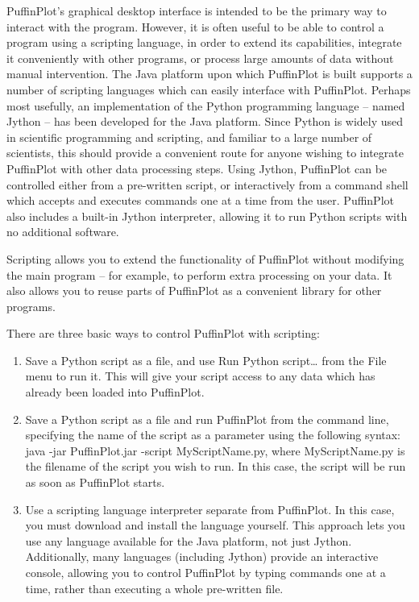 \documentclass[a4paper,british]{article}
\newcommand{\ppcmd}[1]{\textsf{#1}} %
\begin{document}
PuffinPlot's graphical desktop interface is intended to be the primary way to
interact with the program. However, it is often useful to be able to control
a program using a scripting language, in order to extend its capabilities,
integrate it conveniently with other programs, or process large amounts of
data without manual intervention. The Java platform upon which PuffinPlot is
built supports a number of scripting languages which can easily interface
with PuffinPlot. Perhaps most usefully, an implementation of the Python
programming language -- named Jython \citep{juneau2009jython} -- has been
developed for the Java platform. Since Python is widely used in scientific
programming and scripting, and familiar to a large number of scientists, this
should provide a convenient route for anyone wishing to integrate PuffinPlot
with other data processing steps. Using Jython, PuffinPlot can be controlled
either from a pre-written script, or interactively from a command shell which
accepts and executes commands one at a time from the user. PuffinPlot also
includes a built-in Jython interpreter, allowing it to run Python scripts
with no additional software.

Scripting allows you to extend the functionality of PuffinPlot without
modifying the main program -- for example, to perform extra processing on
your data. It also allows you to reuse parts of PuffinPlot as a convenient
library for other programs.

There are three basic ways to control PuffinPlot with scripting:

\begin{enumerate}

\item Save a Python script as a file, and use \ppcmd{Run Python script\ldots}
  from the \ppcmd{File} menu to run it. This will give your script access to
  any data which has already been loaded into PuffinPlot.

\item Save a Python script as a file and run PuffinPlot from the command
  line, specifying the name of the script as a parameter using the following
  syntax: \ppcmd{java -jar PuffinPlot.jar -script MyScriptName.py}, where
  \ppcmd{MyScriptName.py} is the filename of the script you wish to run.
  In this case, the script will be run as soon as PuffinPlot starts.

\item Use a scripting language interpreter separate from PuffinPlot. In this
  case, you must download and install the language yourself. This approach
  lets you use any language available for the Java platform, not just Jython.
  Additionally, many languages (including Jython) provide an interactive
  console, allowing you to control PuffinPlot by typing commands one at a
  time, rather than executing a whole pre-written file.

\end{enumerate}
\end{document}
